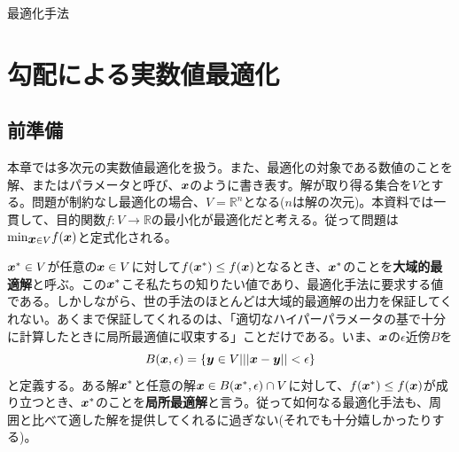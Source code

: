 \documentclass[dvipdfmx, 9pt, a4paper]{jsarticle}
\numberwithin{equation}{section}
\newcommand{\bm}[1]{{\mbox{\boldmath $#1$}}}
\begin{document}
\begin{center}
{\fontsize{18pt}{1pt}\selectfont 最適化手法}\\
\end{center}

\section{勾配による実数値最適化}
\subsection{前準備}
本章では多次元の実数値最適化を扱う。また、最適化の対象である数値のことを解、またはパラメータと呼び、$\bm x$のように書き表す。解が取り得る集合を$V$とする。問題が制約なし最適化の場合、$V=\mathbb{R}^n$となる($n$は解の次元)。本資料では一貫して、目的関数$f:V \to \mathbb{R}$の最小化が最適化だと考える。従って問題は${\rm min}_{\bm x \in V} f(\bm x)$と定式化される。\par
$\bm x^* \in V$が任意の$\bm x \in V$に対して$f(\bm x^*) \leq f(\bm x)$となるとき、$\bm x^*$のことを{\bf 大域的最適解}と呼ぶ。この$\bm x^*$こそ私たちの知りたい値であり、最適化手法に要求する値である。しかしながら、世の手法のほとんどは大域的最適解の出力を保証してくれない。あくまで保証してくれるのは、「適切なハイパーパラメータの基で十分に計算したときに局所最適値に収束する」ことだけである。いま、$\bm x$の$\epsilon$近傍$B$を
\begin{equation}
B(\bm x, \epsilon)=\{ \bm y \in V||| \bm x-\bm y || < \epsilon \}
\end{equation}
と定義する。ある解$\bm x^*$と任意の解$\bm x \in B(\bm x^*, \epsilon) \cap V$に対して、$f(\bm x^*) \leq f(\bm x)$が成り立つとき、$\bm x^*$のことを{\bf 局所最適解}と言う。従って如何なる最適化手法も、周囲と比べて適した解を提供してくれるに過ぎない(それでも十分嬉しかったりする)。
\end{document}
